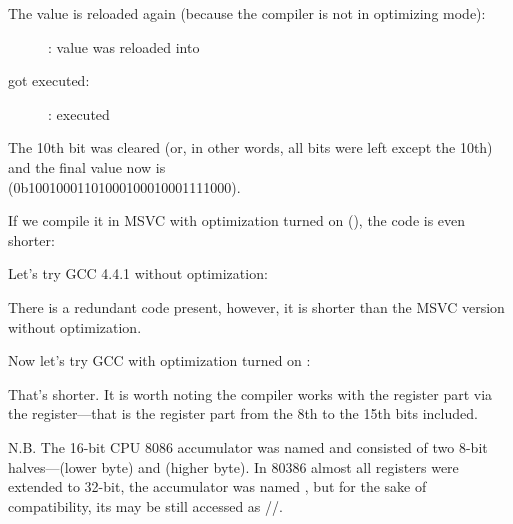 \clearpage
The value is reloaded again (because the compiler is not in optimizing mode): 

\begin{figure}[H]
\centering
{}
\caption{\olly: value was reloaded into \EDX}
\label{fig:set_reset_olly3}
\end{figure}

\clearpage
\AND got executed:

\begin{figure}[H]
\centering
{}
\caption{\olly: \AND executed}
\label{fig:set_reset_olly4}
\end{figure}

The 10th bit was cleared (or, in other words, all bits were left except the 10th) and the final value now is \\
 (0b1001000110100010001{\color{red}0}001111000).


If we compile it in MSVC with optimization turned on (\Ox), the code is even shorter:




Let's try GCC 4.4.1 without optimization:



There is a redundant code present, however, it is shorter than the MSVC version without optimization.

Now let's try GCC with optimization turned on \Othree:




That's shorter.
It is worth noting the compiler works with the \EAX register part via the \AH register---that is the \EAX register part from the 8th to the 15th bits included.


N.B.  The 16-bit CPU 8086 accumulator was named \AX and consisted of two 8-bit 
halves---\AL (lower byte) and \AH (higher byte).
In 80386 almost all registers were extended to 32-bit, the accumulator was named \EAX, 
but for the sake of compatibility,
its  may be still accessed as \AX/\AH/\AL.

